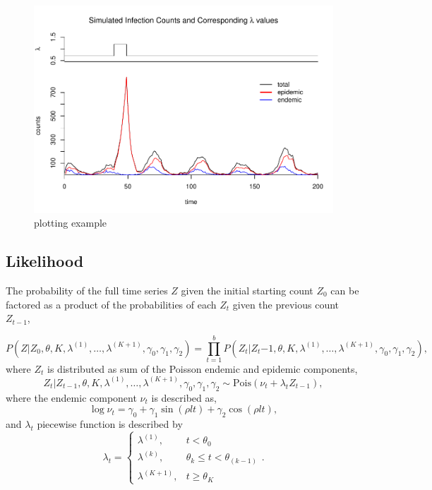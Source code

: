 \documentclass[11pt,a4paper]{article}
\numberwithin{equation}{section}
\begin{document}
\begin{figure}
\centering
\includegraphics{thesis_draft_files/figure-latex/simulation figure-1.pdf}
\caption{\label{fig:figs}plotting example}
\end{figure}

\hypertarget{likelihood}{%
\subsection{Likelihood}\label{likelihood}}

The probability of the full time series \(Z\) given the initial starting
count \(Z_0\) can be factored as a product of the probabilities of each
\(Z_t\) given the previous count \(Z_{t-1}\),

\[P(Z|Z_0,\theta, K, \lambda^{(1)}, \dots, \lambda^{(K+1)}, \gamma_0, \gamma_1, \gamma_2 ) = \prod_{t=1}^b P(Z_t|Z_t{-1}, \theta, K, \lambda^{(1)}, \dots, \lambda^{(K+1)}, \gamma_0, \gamma_1, \gamma_2),\]
where \(Z_t\) is distributed as sum of the Poisson endemic and epidemic
components,
\[Z_t|Z_{t-1}, \theta, K, \lambda^{(1)}, \dots, \lambda^{(K+1)}, \gamma_0, \gamma_1, \gamma_2 \sim\text{Pois}(\nu_t + \lambda_tZ_{t-1}),\]
where the endemic component \(\nu_t\) is described as,
\[\log{\nu_t} = \gamma_0 +  \gamma_{1}\sin(\rho l t)+\gamma_{2}\cos(\rho l t),\]
and \(\lambda_t\) piecewise function is described by
\[ \lambda_t =  \begin{cases} \lambda^{(1)}, & t < \theta_0 \\
\lambda^{(k)}, & \theta_{k} \leq t < \theta_{(k-1)} \\
\lambda^{(K+1)}, & t \geq \theta_K \end{cases}.\]
\end{document}

